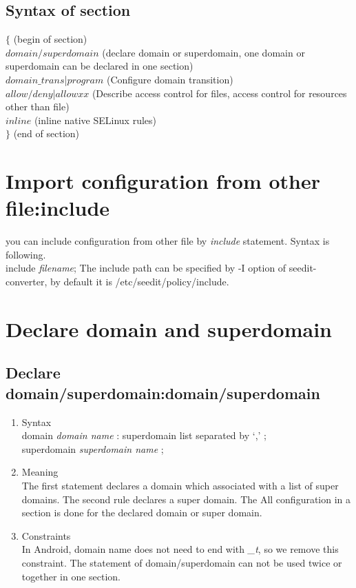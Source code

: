 \documentclass{article}
\begin{document}
\subsection{Syntax of section}

$\{$  (begin of section)\\
$domain/superdomain$  (declare domain or superdomain, one domain or superdomain 
can be declared in one 
section) \\
$domain\_trans$|$program$ (Configure domain transition)\\
$allow/deny$|$allowxx$  (Describe access control for files, access control for 
resources other than file)\\
$inline$ (inline native SELinux rules)\\
$\}$  (end of section)\\

\section{Import configuration from other file:include}
you can include configuration from other file by {\it include}
statement.
Syntax is following.\\
include {\it filename};
The include path can be specified by -I option of seedit-converter, by
default it is /etc/seedit/policy/include.


\section{Declare domain and superdomain}
\subsection{Declare domain/superdomain:domain/superdomain}
\begin{enumerate}
 \item Syntax \\
      domain {\it domain name} : superdomain list separated by `,' ;\\
      \vline \hspace{0.5cm} superdomain {\it superdomain name} ;
 \item Meaning\\
       The first statement declares a domain which associated with a list of 
       super domains. The second rule declares a super domain. The All 
       configuration in a section is done for the declared domain or super 
       domain.
 \item Constraints\\
In Android, domain name does not need to end with {\it \_t}, so we remove this 
constraint. The statement of domain/superdomain can not be used twice or 
together in one section. 
\end{enumerate}
\end{document}
